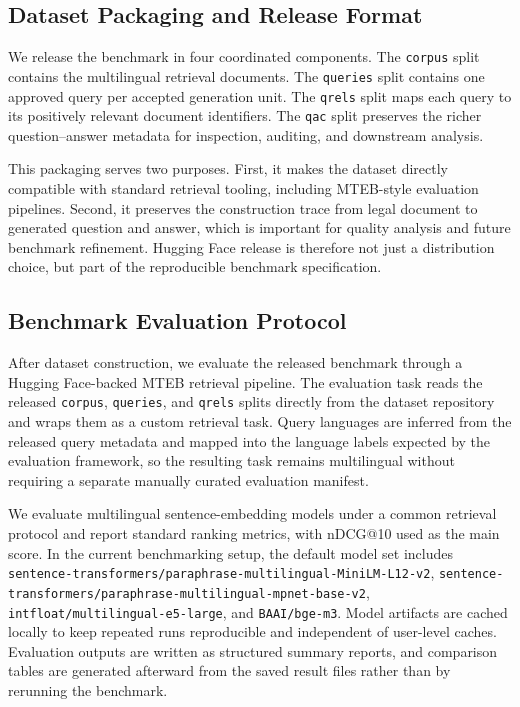 \subsection{Dataset Packaging and Release Format}

We release the benchmark in four coordinated components. The \texttt{corpus} split contains the multilingual retrieval documents. The \texttt{queries} split contains one approved query per accepted generation unit. The \texttt{qrels} split maps each query to its positively relevant document identifiers. The \texttt{qac} split preserves the richer question--answer metadata for inspection, auditing, and downstream analysis.

This packaging serves two purposes. First, it makes the dataset directly compatible with standard retrieval tooling, including MTEB-style evaluation pipelines. Second, it preserves the construction trace from legal document to generated question and answer, which is important for quality analysis and future benchmark refinement. Hugging Face release is therefore not just a distribution choice, but part of the reproducible benchmark specification.

\subsection{Benchmark Evaluation Protocol}

After dataset construction, we evaluate the released benchmark through a Hugging Face-backed MTEB retrieval pipeline. The evaluation task reads the released \texttt{corpus}, \texttt{queries}, and \texttt{qrels} splits directly from the dataset repository and wraps them as a custom retrieval task. Query languages are inferred from the released query metadata and mapped into the language labels expected by the evaluation framework, so the resulting task remains multilingual without requiring a separate manually curated evaluation manifest.

We evaluate multilingual sentence-embedding models under a common retrieval protocol and report standard ranking metrics, with nDCG@10 used as the main score. In the current benchmarking setup, the default model set includes \texttt{sentence-transformers/paraphrase-multilingual-MiniLM-L12-v2}, \texttt{sentence-transformers/paraphrase-multilingual-mpnet-base-v2}, \texttt{intfloat/multilingual-e5-large}, and \texttt{BAAI/bge-m3}. Model artifacts are cached locally to keep repeated runs reproducible and independent of user-level caches. Evaluation outputs are written as structured summary reports, and comparison tables are generated afterward from the saved result files rather than by rerunning the benchmark.


